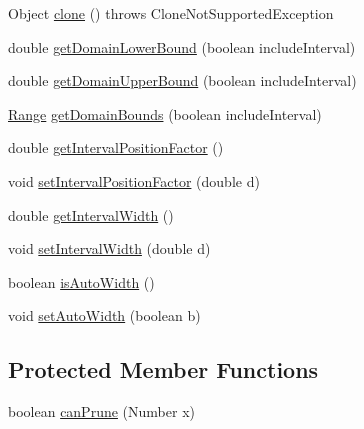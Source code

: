 \begin{DoxyCompactItemize}
\item 
Object \mbox{\hyperlink{classorg_1_1jfree_1_1data_1_1xy_1_1_default_table_x_y_dataset_aad4a34969562e9b961e4f5031e9729ba}{clone}} ()  throws Clone\+Not\+Supported\+Exception 
\item 
double \mbox{\hyperlink{classorg_1_1jfree_1_1data_1_1xy_1_1_default_table_x_y_dataset_abe4d9b10bcde19826e79619c267b1815}{get\+Domain\+Lower\+Bound}} (boolean include\+Interval)
\item 
double \mbox{\hyperlink{classorg_1_1jfree_1_1data_1_1xy_1_1_default_table_x_y_dataset_ad6bbc5140fa56a7fc588d2a6597e208d}{get\+Domain\+Upper\+Bound}} (boolean include\+Interval)
\item 
\mbox{\hyperlink{classorg_1_1jfree_1_1data_1_1_range}{Range}} \mbox{\hyperlink{classorg_1_1jfree_1_1data_1_1xy_1_1_default_table_x_y_dataset_a06adf5ac38cf7beb118b2cbb64a9e10d}{get\+Domain\+Bounds}} (boolean include\+Interval)
\item 
double \mbox{\hyperlink{classorg_1_1jfree_1_1data_1_1xy_1_1_default_table_x_y_dataset_a2d20d1d5dd0249e24fb60675afc03b55}{get\+Interval\+Position\+Factor}} ()
\item 
void \mbox{\hyperlink{classorg_1_1jfree_1_1data_1_1xy_1_1_default_table_x_y_dataset_a10e21ff49eb2c8c5c8035924cd842439}{set\+Interval\+Position\+Factor}} (double d)
\item 
double \mbox{\hyperlink{classorg_1_1jfree_1_1data_1_1xy_1_1_default_table_x_y_dataset_acf1c16cb1c8c70b08709bdcaec541cda}{get\+Interval\+Width}} ()
\item 
void \mbox{\hyperlink{classorg_1_1jfree_1_1data_1_1xy_1_1_default_table_x_y_dataset_a2ac086d1f957fd64071fd96ee89e9649}{set\+Interval\+Width}} (double d)
\item 
boolean \mbox{\hyperlink{classorg_1_1jfree_1_1data_1_1xy_1_1_default_table_x_y_dataset_a2becc82c9d2112ee26e8b94c435792a9}{is\+Auto\+Width}} ()
\item 
void \mbox{\hyperlink{classorg_1_1jfree_1_1data_1_1xy_1_1_default_table_x_y_dataset_a5be77937aa5be052d830af4cb07ab8a4}{set\+Auto\+Width}} (boolean b)
\end{DoxyCompactItemize}
\subsection*{Protected Member Functions}
\begin{DoxyCompactItemize}
\item 
boolean \mbox{\hyperlink{classorg_1_1jfree_1_1data_1_1xy_1_1_default_table_x_y_dataset_aa5def13df2beb3623661177c1795c200}{can\+Prune}} (Number x)
\end{DoxyCompactItemize}


